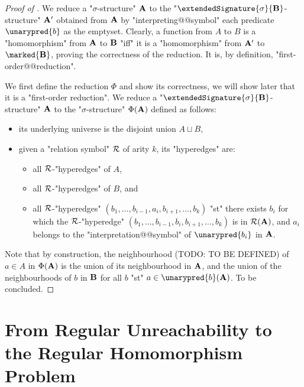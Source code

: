 \begin{proof}[Proof of ]
  We reduce a "$\sigma$-structure" $\mathbf{A}$ to the
  "$\extendedSignature{\sigma}{\?B}$-structure" $\mathbf{A}'$ obtained
  from $\mathbf{A}$ by "interpreting@@symbol" each predicate $\unarypred{b}$ as the emptyset.
  Clearly, a function from $A$ to $B$ is a "homomorphism" from $\mathbf{A}$ to $\mathbf{B}$
  "iff" it is a "homomorphism" from $\mathbf{A}'$ to $\marked{\?B}$, proving the correctness
  of the reduction. It is, by definition, "first-order@@reduction".

  We first define the reduction $\Phi$ and show its correctness, we will show later that it
  is a "first-order reduction". We reduce a "$\extendedSignature{\sigma}{\?B}$-structure" $\mathbf{A}$ to the "$\sigma$-structure"
  $\Phi(\mathbf{A})$ defined as follows:
  \begin{itemize}
    \item its underlying universe is the disjoint union $A \sqcup B$,
    \item given a "relation symbol" $\mathcal{R}$ of arity $k$, its "hyperedges" are:
    \begin{itemize}
      \item all $\mathcal{R}$-"hyperedges" of $A$,
      \item all $\mathcal{R}$-"hyperedges" of $B$, and
      \item all $\mathcal{R}$-"hyperedges" $(b_1,\hdots,b_{i-1}, a_i, b_{i+1},\hdots,b_k)$
        "st" there exists $b_i$ for which the $\mathcal{R}$-"hyperedge"
        $(b_1,\hdots,b_{i-1}, b_i, b_{i+1},\hdots,b_k)$
        is in $\mathcal{R}(\mathbf{A})$, and $a_i$ belongs to the "interpretation@@symbol" of 
        $\unarypred{b_i}$ in $\mathbf{A}$.
    \end{itemize}
  \end{itemize}
  Note that by construction, the neighbourhood (TODO: TO BE DEFINED) of $a \in A$ in $\Phi(\mathbf{A})$ is
  the union of its neighbourhood in $\mathbf{A}$, and the union of the neighbourhoods of
  $b$ in $\mathbf{B}$ for all $b$ "st" $a \in \unarypred{b}(\?A)$.
  To be concluded.  
\end{proof}

\section{From Regular Unreachability to the Regular Homomorphism Problem}

